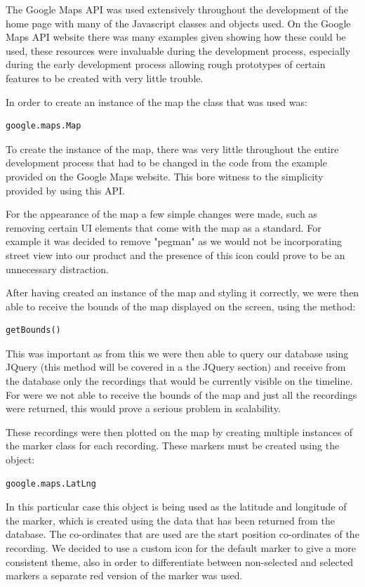 \documentclass{l3proj}
\begin{document}
The Google Maps API was used extensively throughout the development of the home page with many of the Javascript classes and objects used. On the Google Maps API website there was many examples given showing how these could be used, these resources were invaluable during the development process, especially during the early development process allowing rough prototypes of certain features to be created with very little trouble.

In order to create an instance of the map the class that was used was:

\begin{verbatim}
google.maps.Map
\end{verbatim}

To create the instance of the map, there was very little throughout the entire development process that had to be changed in the code from the example provided on the Google Maps website. This bore witness to the simplicity provided by using this API.

For the appearance of the map a few simple changes were made, such as removing certain UI elements that come with the map as a standard. For example it was decided to remove "pegman" as we would not be incorporating street view into our product and the presence of this icon could prove to be an unnecessary distraction.

After having created an instance of the map and styling it correctly, we were then able to receive the bounds of the map displayed on the screen, using the method:

\begin{verbatim}
getBounds()
\end{verbatim}

This was important as from this we were then able to query our database using JQuery (this method will be covered in a the JQuery section) and receive from the database only the recordings that would be currently visible on the timeline. For were we not able to receive the bounds of the map and just all the recordings were returned, this would prove a serious problem in scalability.

These recordings were then plotted on the map by creating multiple instances of the marker class for each recording. These markers must be created using the object:

\begin{verbatim}
google.maps.LatLng
\end{verbatim}

In this particular case this object is being used as the latitude and longitude of the marker, which is created using the data that has been returned from the database. The co-ordinates that are used are the start position co-ordinates of the recording. We decided to use a custom icon for the default marker to give a more consistent theme, also in order to differentiate between non-selected and selected markers a separate red version of the marker was used.
\end{document}
